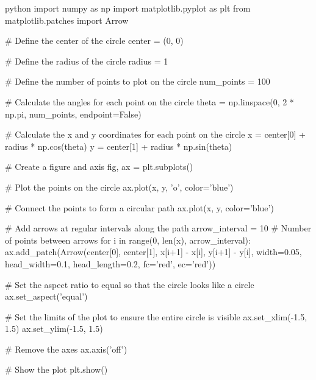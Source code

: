 python
import numpy as np
import matplotlib.pyplot as plt
from matplotlib.patches import Arrow

# Define the center of the circle
center = (0, 0)

# Define the radius of the circle
radius = 1

# Define the number of points to plot on the circle
num_points = 100

# Calculate the angles for each point on the circle
theta = np.linspace(0, 2 * np.pi, num_points, endpoint=False)

# Calculate the x and y coordinates for each point on the circle
x = center[0] + radius * np.cos(theta)
y = center[1] + radius * np.sin(theta)

# Create a figure and axis
fig, ax = plt.subplots()

# Plot the points on the circle
ax.plot(x, y, 'o', color='blue')

# Connect the points to form a circular path
ax.plot(x, y, color='blue')

# Add arrows at regular intervals along the path
arrow_interval = 10  # Number of points between arrows
for i in range(0, len(x), arrow_interval):
    ax.add_patch(Arrow(center[0], center[1], 
                       x[i+1] - x[i], 
                       y[i+1] - y[i],
                       width=0.05,
                       head_width=0.1,
                       head_length=0.2,
                       fc='red',
                       ec='red'))

# Set the aspect ratio to equal so that the circle looks like a circle
ax.set_aspect('equal')

# Set the limits of the plot to ensure the entire circle is visible
ax.set_xlim(-1.5, 1.5)
ax.set_ylim(-1.5, 1.5)

# Remove the axes
ax.axis('off')

# Show the plot
plt.show()